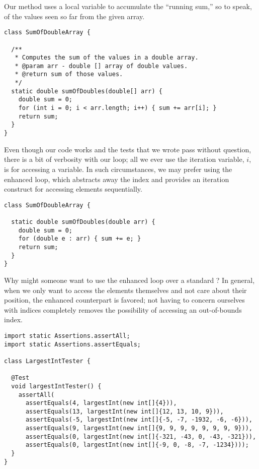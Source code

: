 Our method uses a local variable to accumulate the ``running sum,'' so to speak, of the values seen so far from the given array.

\begin{lstlisting}[language=MyJava]
class SumOfDoubleArray {

  /**
   * Computes the sum of the values in a double array.
   * @param arr - double [] array of double values.
   * @return sum of those values.
   */
  static double sumOfDoubles(double[] arr) {
    double sum = 0;
    for (int i = 0; i < arr.length; i++) { sum += arr[i]; }
    return sum;
  }
}
\end{lstlisting}

Even though our code works and the tests that we wrote pass without question, there is a bit of verbosity with our loop; all we ever use the iteration variable, $i$, is for accessing a variable. In such circumstances, we may prefer using the enhanced  loop, which abstracts away the index and provides an iteration construct for accessing elements sequentially.

\begin{lstlisting}[language=MyJava]
class SumOfDoubleArray {

  static double sumOfDoubles(double arr) {
    double sum = 0;
    for (double e : arr) { sum += e; }
    return sum;
  }
}
\end{lstlisting}

Why might someone want to use the enhanced  loop over a standard ? In general, when we only want to access the elements themselves and not care about their position, the enhanced counterpart is favored; not having to concern ourselves with indices completely removes the possibility of accessing an out-of-bounds index. 


\begin{lstlisting}[language=MyJava]
import static Assertions.assertAll;
import static Assertions.assertEquals;

class LargestIntTester {

  @Test
  void largestIntTester() {
    assertAll(
      assertEquals(4, largestInt(new int[]{4})), 
      assertEquals(13, largestInt(new int[]{12, 13, 10, 9})), 
      assertEquals(-5, largestInt(new int[]{-5, -7, -1932, -6, -6})), 
      assertEquals(9, largestInt(new int[]{9, 9, 9, 9, 9, 9, 9, 9})), 
      assertEquals(0, largestInt(new int[]{-321, -43, 0, -43, -321})), 
      assertEquals(0, largestInt(new int[]{-9, 0, -8, -7, -1234})));
  }
}
\end{lstlisting}

